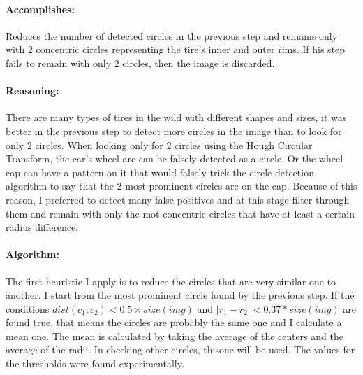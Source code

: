 \paragraph*{Accomplishes:}\mbox{}\par
Reduces the number of detected circles in the previous step and remains only with 2 concentric circles representing the tire's inner and outer rims. If his step fails to remain with only 2 circles, then the image is discarded.

\paragraph*{Reasoning:}\mbox{}\par
There are many types of tires in the wild with different shapes and sizes, it was better in the previous step to detect more circles in the image than to look for only 2 circles. When looking only for 2 circles using the Hough Circular Transform, the car's wheel arc can be falsely detected as a circle. Or the wheel cap can have a pattern on it that would falsely trick the circle detection algorithm to say that the 2 most prominent circles are on the cap. Because of this reason, I preferred to detect many false positives and at this stage filter through them and remain with only the mot concentric circles that have at least a certain radius difference.

\paragraph*{Algorithm:}\mbox{}\par
The first heuristic I apply is to reduce the circles that are very similar one to another. I start from the most prominent circle found by the previous step. If the conditions $dist(c_1, c_2) < 0.5 \times size(img)$ and $\Big|r_1 - r_2\Big| < 0.37 * size(img)$ are found true, that means the circles are probably the same one and I calculate a mean one. The mean is calculated by taking the average of the centers and the average of the radii. In checking other circles, thisone will be used. The values for the thresholds were found experimentally.

